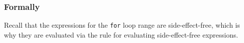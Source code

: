 \subsubsection{Formally}
Recall that the expressions for the \texttt{for} loop range are side-effect-free,
which is why they are evaluated via the rule for evaluating side-effect-free expressions.
\begin{mathpar}
\end{mathpar}

